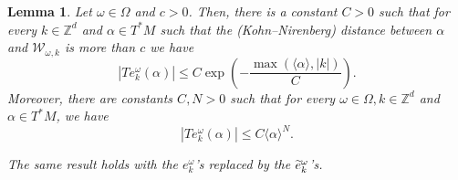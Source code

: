 \documentclass[10pt]{amsart}
\newtheorem{lemm}[theo]{Lemma}\newtheorem{prop}[theo]{Proposition}\newtheorem{coro}[theo]{Corollary}\newtheorem{conj}[theo]{Conjecture}
\theoremstyle{definition}\newtheorem{defi}[theo]{Definition}\newtheorem{rema}[theo]{Remark}\newtheorem{exam}[theo]{Example}\newtheorem{exem}[theo]{Example}\newtheorem{nota}[theo]{Notation}
\newcommand{\p}[1]{\left(#1\right)}
\newcommand{\va}[1]{\left|#1\right|}
\newcommand{\brac}[1]{\langle #1 \rangle}
\newcommand{\clW}{\mathcal{W}}
\newcommand{\bbZ}{\mathbb{Z}}
\let\oldtilde\tilde
\renewcommand*{\tilde}[1]{\mathchoice{\widetilde{#1}}{\widetilde{#1}}{\oldtilde{#1}}{\oldtilde{#1}}}
\begin{document}
\begin{lemm}\label{lemma:localisation}
Let $\omega \in \Omega$ and $c > 0$. Then, there is a constant $C > 0$ such that for every $k \in \bbZ^d$ and $\alpha \in T^* M$ such that the (Kohn--Nirenberg) distance between $\alpha$ and $\clW_{\omega,k}$ is more than $c$ we have
\begin{equation}\label{eq:exponential_localisation}
\va{T e_k^\omega(\alpha)} \leq C \exp\p{- \frac{\max(\brac{\alpha},\va{k})}{C}}.
\end{equation}
Moreover, there are constants $C,N > 0$ such that for every $\omega \in \Omega,k \in \bbZ^d$ and $\alpha \in T^* M$, we have
\begin{equation}\label{eq:straight_local}
\va{T e_k^\omega(\alpha)} \leq C \brac{\alpha}^{N}.
\end{equation}

The same result holds with the $e_k^\omega$'s replaced by the $\tilde{e}_k^\omega$'s.
\end{lemm}
\end{document}
